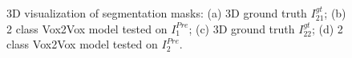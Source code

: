 \begin{figure}[!htb]
\centering
{}\hfil
{}

\hfil 
{}

\caption{3D visualization of segmentation masks: (a) 3D ground truth $I^{gt}_{21}$; (b) 2 class Vox2Vox model tested on $I^{Pre}_1$; (c) 3D ground truth $I^{gt}_{22}$; (d) 2 class Vox2Vox model tested on $I^{Pre}_2$.}

\label{fig:results-vox2vox-2channel}

\end{figure}

